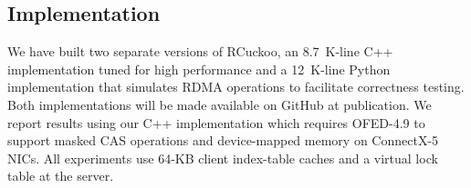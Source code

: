 \subsection{Implementation}

We have built two separate versions of RCuckoo, an 8.7~K-line C++
implementation tuned for high performance and a 12~K-line Python
implementation that simulates RDMA operations to facilitate
correctness testing. Both implementations will be made available on
GitHub at publication.  We report results using our C++
implementation which requires OFED-4.9 to support masked CAS
operations and device-mapped memory on ConnectX-5 NICs.  All
experiments use 64-KB client index-table caches and
a virtual lock table at the server.
